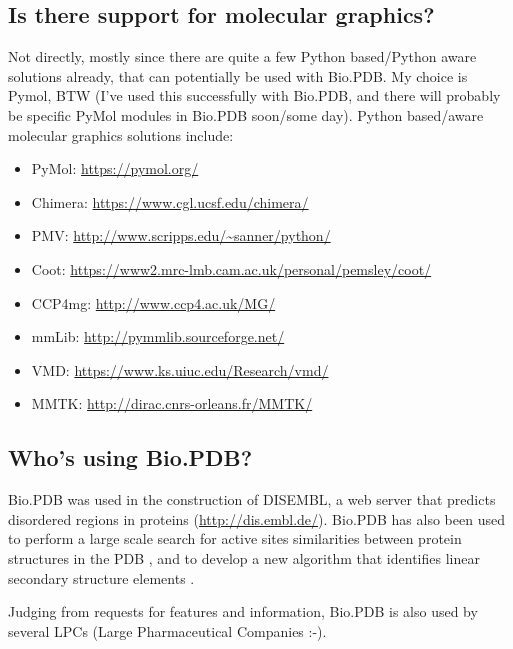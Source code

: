 \subsection{Is there support for molecular graphics?}

Not directly, mostly since there are quite a few Python based/Python
aware solutions already, that can potentially be used with Bio.PDB.
My choice is Pymol, BTW (I've used this successfully with Bio.PDB,
and there will probably be specific PyMol modules in Bio.PDB soon/some
day). Python based/aware molecular graphics solutions include:

\begin{itemize}
\item PyMol: \url{https://pymol.org/}
\item Chimera: \url{https://www.cgl.ucsf.edu/chimera/}
\item PMV: \url{http://www.scripps.edu/~sanner/python/}
\item Coot: \url{https://www2.mrc-lmb.cam.ac.uk/personal/pemsley/coot/}
\item CCP4mg: \url{http://www.ccp4.ac.uk/MG/}
\item mmLib: \url{http://pymmlib.sourceforge.net/}
\item VMD: \url{https://www.ks.uiuc.edu/Research/vmd/}
\item MMTK: \url{http://dirac.cnrs-orleans.fr/MMTK/}
\end{itemize}

\subsection{Who's using Bio.PDB?}

Bio.PDB was used in the construction of DISEMBL, a web server that
predicts disordered regions in proteins (\url{http://dis.embl.de/}). Bio.PDB has also been used to
perform a large scale search for active sites similarities between
protein structures in the PDB \cite[Hamelryck, 2003]{hamelryck2003b}, and to develop a new algorithm
that identifies linear secondary structure elements \cite[Majumdar \textit{et al.}, 2005]{majumdar2005}.

Judging from requests for features and information, Bio.PDB is also
used by several LPCs (Large Pharmaceutical Companies :-).

